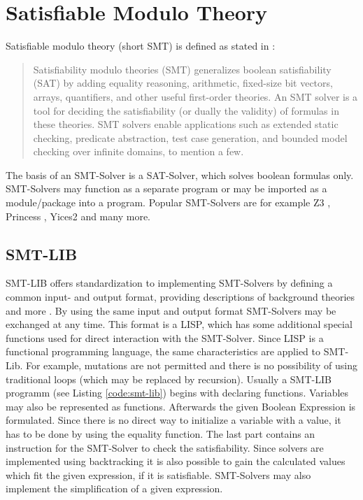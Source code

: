 
\section{Satisfiable Modulo Theory}

Satisfiable modulo theory (short SMT) is defined as stated in \cite{demouraZ3EfficientSMT2008}:

\begin{quote}
	Satisfiability modulo theories (SMT) generalizes boolean satisfiability (SAT) by
	adding equality reasoning, arithmetic, fixed-size bit vectors, arrays, quantifiers,
	and other useful first-order theories. An SMT solver is a tool for deciding the satisfiability (or dually the validity) of formulas in these theories. SMT solvers enable
	applications such as extended static checking, predicate abstraction, test case generation, and bounded model checking over infinite domains, to mention a few. 
\end{quote}

The basis of an SMT-Solver is a SAT-Solver, which solves boolean formulas only. SMT-Solvers may function as a separate program or may be imported as a module/package into a program. 
Popular SMT-Solvers are for example Z3 \cite{demouraZ3EfficientSMT2008}, Princess \cite{princess08}, Yices2 \cite{Dutertre:cav2014} and many more.

\subsection{SMT-LIB}
SMT-LIB offers standardization to implementing SMT-Solvers by defining a common input- and output format, providing descriptions of background theories and more \cite{cokSMTLIBv2LanguageTools}. %
By using the same input and output format SMT-Solvers may be exchanged at any time. 
This format is a LISP, which has some additional special functions used for direct interaction with the SMT-Solver. Since LISP is a functional programming language, the same characteristics are applied to SMT-Lib.
For example, mutations are not permitted and there is no possibility of using traditional loops (which may be replaced by recursion).
Usually a SMT-LIB programm (see Listing \ref{code:smt-lib}) begins with declaring functions. Variables may also be represented as functions. 
Afterwards the given Boolean Expression is formulated. Since there is no direct way to initialize a variable with a value, it has to be done by using the equality function. 
The last part contains an instruction for the SMT-Solver to check the satisfiability. 
Since solvers are implemented using backtracking it is also possible to gain the calculated values which fit the given expression, if it is satisfiable. 
SMT-Solvers may also implement the simplification of a given expression.

